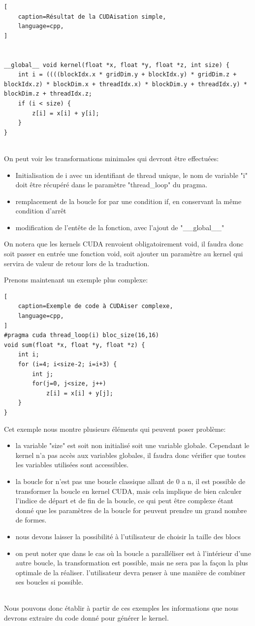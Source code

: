 \documentclass{article}
\begin{document}
\begin{lstlisting}[
	caption=Résultat de la CUDAisation simple,
    language=cpp,
]


__global__ void kernel(float *x, float *y, float *z, int size) { 
	int i = ((((blockIdx.x * gridDim.y + blockIdx.y) * gridDim.z + blockIdx.z) * blockDim.x + threadIdx.x) * blockDim.y + threadIdx.y) * blockDim.z + threadIdx.z;
	if (i < size) {
		z[i] = x[i] + y[i];
	}
}
	
\end{lstlisting}	
	On peut voir les transformations minimales qui devront être effectuées:
	\begin{itemize}
	\item Initialisation de i avec un identifiant de thread unique, le nom de variable "i" doit être récupéré dans le paramètre "thread\_loop" du pragma.
	\item remplacement de la boucle for par une condition if, en conservant la même condition d'arrêt
	\item modification de l’entête de la fonction, avec l'ajout de "\_\_global\_\_"
	\end{itemize}
	
On notera que les kernels CUDA renvoient obligatoirement void, il faudra donc soit passer en entrée une fonction void, soit ajouter un paramètre au kernel qui servira de valeur de retour lors de la traduction.	
	
	Prenons maintenant un exemple plus complexe:
			\begin{lstlisting}[
	caption=Exemple de code à CUDAiser complexe,
    language=cpp,
]
#pragma cuda thread_loop(i) bloc_size(16,16)
void sum(float *x, float *y, float *z) { 
	int i;
	for (i=4; i<size-2; i=i+3) {
		int j;
		for(j=0, j<size, j++)
			z[i] = x[i] + y[j];
	}
}
	\end{lstlisting}	
	Cet exemple nous montre plusieurs éléments qui peuvent poser problème:
	\begin{itemize}
	\item la variable "size" est soit non initialisé soit une variable globale. Cependant le kernel n'a pas accès aux variables globales, il faudra donc vérifier que toutes les variables utilisées sont accessibles.
	\item la boucle for n'est pas une boucle classique allant de 0 a n, il est possible de transformer la boucle en kernel CUDA, mais cela implique de bien calculer l'indice de départ et de fin de la boucle, ce qui peut être complexe étant donné que les paramètres de la boucle for peuvent prendre un grand nombre de formes.
	\item nous devons laisser la possibilité à l'utilisateur de choisir la taille des blocs
	\item on peut noter que dans le cas où la boucle a paralléliser est à l’intérieur d'une autre boucle, la transformation est possible, mais ne sera pas la façon la plus optimale de la réaliser. l'utilisateur devra penser à une manière de combiner ses boucles si possible.
	\end{itemize}
	~~\\
	\indent
	Nous pouvons donc établir à partir de ces exemples les informations que nous devrons extraire du code donné pour générer le kernel.	
	
\end{document}
